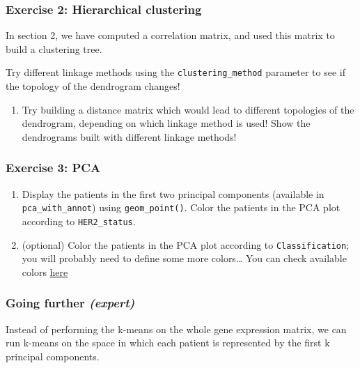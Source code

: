 \documentclass[
]{book}
\providecommand{\tightlist}{%
  \setlength{\itemsep}{0pt}\setlength{\parskip}{0pt}}
\begin{document}
\hypertarget{exercise-2-hierarchical-clustering}{%
\subsubsection{Exercise 2: Hierarchical clustering}\label{exercise-2-hierarchical-clustering}}

In section 2, we have computed a correlation matrix, and used this matrix to build a clustering tree.

Try different linkage methods using the \texttt{clustering\_method} parameter to see if the topology of the dendrogram changes!

\begin{enumerate}
\def\labelenumi{\arabic{enumi}.}
\setcounter{enumi}{1}
\tightlist
\item
  Try building a distance matrix which would lead to different topologies of the dendrogram, depending on which linkage method is used! Show the dendrograms built with different linkage methods!
\end{enumerate}

\hypertarget{exercise-3-pca}{%
\subsubsection{Exercise 3: PCA}\label{exercise-3-pca}}

\begin{enumerate}
\def\labelenumi{\arabic{enumi}.}
\item
  Display the patients in the first two principal components (available in \texttt{pca\_with\_annot}) using \texttt{geom\_point()}. Color the patients in the PCA plot according to \texttt{HER2\_status}.
\item
  (optional) Color the patients in the PCA plot according to \texttt{Classification}; you will probably need to define some more colors\ldots{} You can check available colors \href{http://www.stat.columbia.edu/~tzheng/files/Rcolor.pdf}{here}
\end{enumerate}

\hypertarget{going-further-expert-1}{%
\subsubsection{\texorpdfstring{Going further \emph{(expert)}}{Going further (expert)}}\label{going-further-expert-1}}

Instead of performing the k-means on the whole gene expression matrix, we can run k-means on the space in which each patient is represented by the first k principal components.
\end{document}
